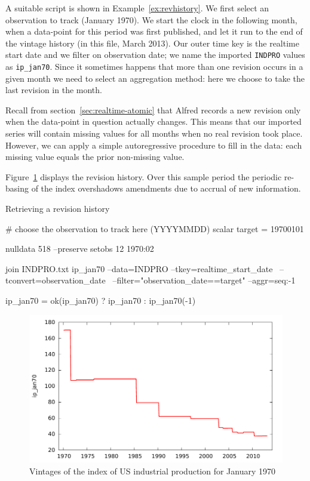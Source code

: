 A suitable script is shown in Example~\ref{ex:revhistory}.  We first
select an observation to track (January 1970). We start the clock in
the following month, when a data-point for this period was first
published, and let it run to the end of the vintage history (in this
file, March 2013).  Our outer time key is the realtime start date and
we filter on observation date; we name the imported \texttt{INDPRO}
values as \texttt{ip\_jan70}. Since it sometimes happens that more
than one revision occurs in a given month we need to select an
aggregation method: here we choose to take the last revision in the
month.

Recall from section~\ref{sec:realtime-atomic} that Alfred records a
new revision only when the data-point in question actually
changes. This means that our imported series will contain missing
values for all months when no real revision took place. However, we
can apply a simple autoregressive procedure to fill in the data: each
missing value equals the prior non-missing value.

Figure~\ref{fig:realtime-revhist} displays the revision history. Over
this sample period the periodic re-basing of the index overshadows
amendments due to accrual of new information.

\begin{script}[htbp]
  \caption{Retrieving a revision history}
  \label{ex:revhistory}
\begin{scode}
# choose the observation to track here (YYYYMMDD)
scalar target = 19700101

nulldata 518 --preserve
setobs 12 1970:02

join INDPRO.txt ip_jan70 --data=INDPRO --tkey=realtime_start_date \
--tconvert=observation_date \
--filter="observation_date==target" --aggr=seq:-1

ip_jan70 = ok(ip_jan70) ? ip_jan70 : ip_jan70(-1)
\end{scode}
\end{script}

\begin{figure}[htbp]
  \centering
\includegraphics[scale=0.75]{figures/revhist}
\caption{Vintages of the index of US industrial production for January
  1970}
  \label{fig:realtime-revhist}
\end{figure}

    
